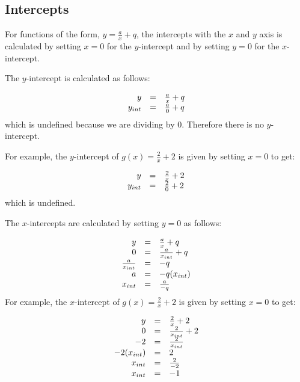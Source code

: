 \subsection*{Intercepts}
\nopagebreak
For functions of the form, $y=\frac{a}{x}+q$, the intercepts with the $x$ and $y$ axis is calculated by setting $x=0$ for the $y$-intercept and by setting $y=0$ for the $x$-intercept.\par 
The $y$-intercept is calculated as follows:\par 
\nopagebreak\noindent{}
\begin{equation*}
\begin{array}{ccc}\hfill y& =& \frac{a}{x}+q\hfill \\ \hfill {y}_{int}& =& \frac{a}{0}+q\hfill \end{array}
\end{equation*}
which is undefined because we are dividing by $0$. Therefore there is no $y$-intercept.\par 
For example, the $y$-intercept of $g(x)=\frac{2}{x}+2$ is given by setting $x=0$ to get:\par 
\nopagebreak\noindent{}
\begin{equation*}
\begin{array}{ccc}\hfill y& =& \frac{2}{x}+2\hfill \\ \hfill {y}_{int}& =& \frac{2}{0}+2\hfill \end{array}
\end{equation*}
which is undefined.\par 
The $x$-intercepts are calculated by setting $y=0$ as follows:\par 
\nopagebreak\noindent{}
\begin{equation*}
\begin{array}{ccc}\hfill y& =& \frac{a}{x}+q\hfill \\ \hfill 0& =& \frac{a}{{x}_{int}}+q\hfill \\ \hfill \frac{a}{{x}_{int}}& =& -q\hfill \\ \hfill a& =& -q({x}_{int})\hfill \\ \hfill {x}_{int}& =& \frac{a}{-q}\hfill \end{array}
\end{equation*}
For example, the $x$-intercept of $g(x)=\frac{2}{x}+2$ is given by setting $x=0$ to get:\par 
\nopagebreak\noindent{}
\begin{equation*}
\begin{array}{ccc}\hfill y& =& \frac{2}{x}+2\hfill \\ \hfill 0& =& \frac{2}{{x}_{int}}+2\hfill \\ \hfill -2& =& \frac{2}{{x}_{int}}\hfill \\ \hfill -2({x}_{int})& =& 2\hfill \\ \hfill {x}_{int}& =& \frac{2}{-2}\hfill \\ \hfill {x}_{int}& =& -1\hfill \end{array}
\end{equation*}

